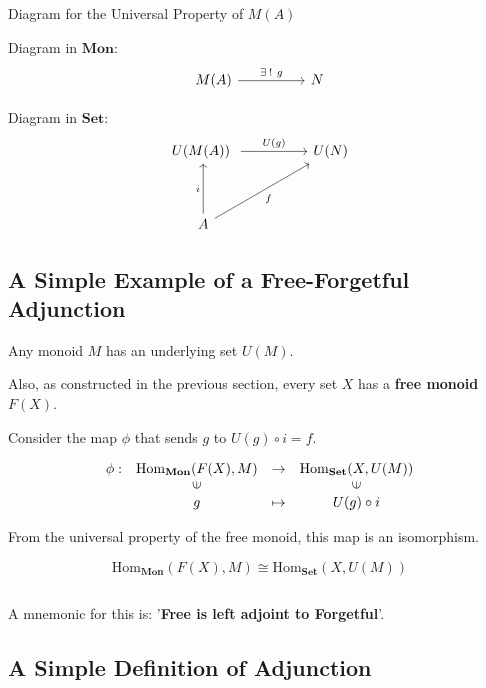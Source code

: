 \documentclass[uplatex,a4j,12pt,dvipdfmx]{jsarticle}
\begin{document}
\begin{itembox}[l]{Diagram for the Universal Property of $M(A)$}

	Diagram in $\mathbf{Mon}$:
	\[
		\begin{tikzcd}
			M(A) \arrow[rr, "\exists \ \! ! \ g"] && N
		\end{tikzcd}
	\]

	Diagram in $\mathbf{Set}$:
	\[
		\begin{tikzcd}
			U(M(A)) \arrow[rr, "U(g)"] && U(N) \\
			&&\\
			A \arrow[uu, "i"] \arrow[rruu, "f"'] &&
		\end{tikzcd}
	\]

\end{itembox}

\subsection{A Simple Example of a Free-Forgetful Adjunction}

Any monoid $M$ has an underlying set $U(M)$.

Also, as constructed in the previous section, every set $X$ has a \textbf{free monoid} $F(X)$.

Consider the map $\phi$ that sends $g$ to $U(g) \circ i = f$.

\[
	\begin{array}{cccc}
		\phi : & \mathrm{Hom}_{\mathbf{Mon}}(F(X), M) & \to     & \mathrm{Hom}_{\mathbf{Set}}(X, U(M)) \\
		       & \rotatebox{90}{${\in}$}              &         & \rotatebox{90}{${\in}$}              \\
		       & g                                    & \mapsto & U(g) \circ i
	\end{array}
\]

From the universal property of the free monoid, this map is an isomorphism.

$$
	\mathrm{Hom}_{\mathbf{Mon}}(F(X), M) \cong \mathrm{Hom}_{\mathbf{Set}}(X, U(M))
$$

${}$

A mnemonic for this is: '\textbf{Free is left adjoint to Forgetful}'.

\subsection{A Simple Definition of Adjunction}
\end{document}
